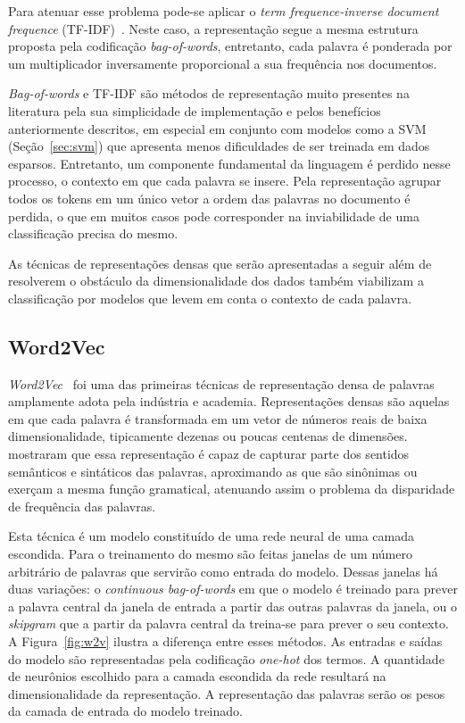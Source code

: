 Para atenuar esse problema pode-se aplicar o \textit{term frequence-inverse
document frequence} (TF-IDF)~\cite{salton88}.
Neste caso, a representação segue a mesma estrutura proposta pela codificação
\textit{bag-of-words}, entretanto, cada palavra é ponderada por um multiplicador
inversamente proporcional a sua frequência nos documentos.


\textit{Bag-of-words} e TF-IDF são métodos de representação muito presentes na
literatura pela sua simplicidade de implementação e pelos benefícios
anteriormente descritos, em especial em conjunto com modelos como a
SVM (Seção~\ref{sec:svm}) que apresenta menos dificuldades de ser treinada em dados
esparsos.
Entretanto, um componente fundamental da linguagem é perdido nesse processo, o
contexto em que cada palavra se insere.
Pela representação agrupar todos os tokens em um único vetor a ordem das
palavras no documento é perdida, o que em muitos casos pode corresponder na
inviabilidade de uma classificação precisa do mesmo.


As técnicas de representações densas que serão apresentadas a seguir além de
resolverem o obstáculo da dimensionalidade dos dados também viabilizam a
classificação por modelos que levem em conta o contexto de cada palavra.

\subsection{Word2Vec} \label{sec:w2v}

\textit{Word2Vec}~\cite{mikolov13} foi uma das primeiras técnicas de
representação densa de palavras amplamente adota pela indústria e academia.
Representações densas são aquelas em que cada palavra é transformada em um vetor
de números reais de baixa dimensionalidade, tipicamente dezenas ou poucas
centenas de dimensões.
\citet{mikolov13} mostraram que essa representação é capaz de capturar parte dos
sentidos semânticos e sintáticos das palavras, aproximando as que são sinônimas
ou exerçam a mesma função gramatical, atenuando assim o problema da disparidade
de frequência das palavras.

Esta técnica é um modelo constituído de uma rede neural de uma camada escondida.
Para o treinamento do mesmo são feitas janelas de um número arbitrário de
palavras que servirão como entrada do modelo.
Dessas janelas há duas variações: o \textit{continuous bag-of-words} em que
o modelo é treinado para prever a palavra central da janela de entrada a partir
das outras palavras da janela, ou o \textit{skipgram} que a partir da palavra
central da treina-se para prever o seu contexto.
A Figura~\ref{fig:w2v} ilustra a diferença entre esses métodos.
As entradas e saídas do modelo são representadas pela codificação
\textit{one-hot} dos termos.
A quantidade de neurônios escolhido para a camada escondida da rede resultará na
dimensionalidade da representação.
A representação das palavras serão os pesos da camada de entrada do modelo
treinado.

